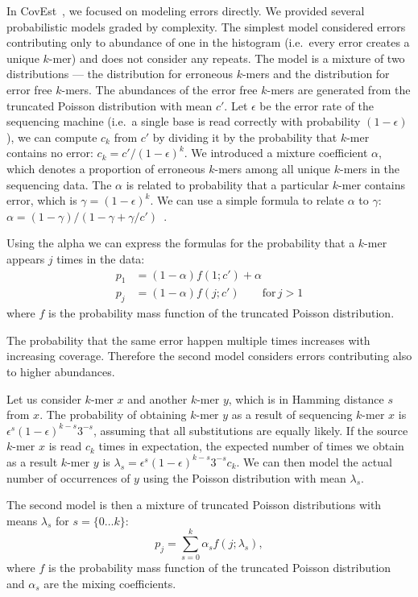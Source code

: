 In CovEst~\cite{covest}, we focused on modeling errors directly. We provided several probabilistic models graded by complexity.
The simplest model considered errors contributing only to abundance of one in the histogram (i.e.\ every error creates a unique $k$-mer) and does not consider any repeats.
The model is a mixture of two distributions --- the distribution for erroneous $k$-mers and the distribution for error free $k$-mers. The abundances of the error free $k$-mers are generated from the truncated Poisson distribution with mean $c'$.
Let $\epsilon$ be the error rate of the sequencing machine (i.e.\ a single base is read correctly with probability $(1-\epsilon)$), we can compute $c_k$ from $c'$ by dividing it by the probability that $k$-mer contains no error: $c_k = c'/{(1-\epsilon)}^k$.
We introduced a mixture coefficient $\alpha$, which denotes a proportion of erroneous $k$-mers among all unique $k$-mers in the sequencing data. The $\alpha$ is related to probability that a particular $k$-mer contains error, which is $\gamma = {(1-\epsilon)}^k$.
We can use a simple formula to relate $\alpha$ to $\gamma$: $\alpha = (1-\gamma)/(1-\gamma+\gamma/c')$~\cite{covest}.

Using the alpha we can express the formulas for the probability that a $k$-mer appears $j$ times in the data:
\begin{align*}
p_1 &= (1-\alpha) f(1; c') + \alpha \\
p_j &= (1-\alpha) f(j; c') \qquad\text{for}\, j>1
\end{align*}
where $f$ is the probability mass function of the truncated Poisson
distribution.

The probability that the same error happen multiple times increases with increasing coverage. Therefore the second model considers errors contributing also to higher abundances.

Let us consider $k$-mer $x$ and another $k$-mer $y$,
which is in Hamming distance $s$ from $x$. The probability of
obtaining $k$-mer $y$ as a result of sequencing $k$-mer $x$ is
$\epsilon^s {(1-\epsilon)}^{k-s} 3^{-s}$, assuming that all
substitutions are equally likely. If the source $k$-mer $x$ is read
$c_k$ times in expectation, the expected number of times we obtain as
a result $k$-mer $y$ is $\lambda_s = \epsilon^s {(1-\epsilon)}^{k-s}
3^{-s} c_k$. We can then model the actual number of occurrences of $y$ using the Poisson distribution with mean $\lambda_s$.

The second model is then a mixture of truncated Poisson distributions with means $\lambda_s$ for $s = \{0\dots k\}$:
$$p_j = \sum_{s=0}^k \alpha_s f(j; \lambda_s),$$
where $f$ is the probability mass function of the truncated Poisson
distribution and $\alpha_s$ are the mixing coefficients.

